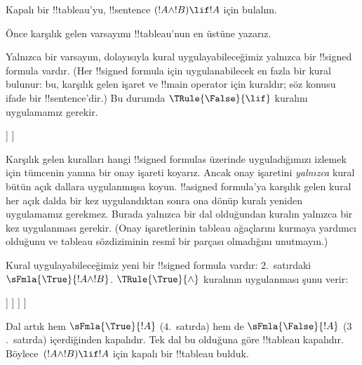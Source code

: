 

      {}
      {}


\begin{ex}
Kapalı bir !!{tableau}'yu, !!{sentence} $(!A \land !B) \lif !A$ için bulalım.

Önce karşılık gelen varsayımı !!{tableau}'nun en üstüne yazarız.
\begin{oltableau}
  [\sFmla{\False}{(\formula{A} \land \formula{B}) \lif \formula{A}},
    just = \TAss]
\end{oltableau}

Yalnızca bir varsayım, dolayısıyla kural uygulayabileceğimiz yalnızca bir
!!{signed formula} vardır. (Her !!{signed formula} için uygulanabilecek en
fazla bir kural bulunur: bu, karşılık gelen işaret ve !!{main operator} için
kuraldır; söz konusu ifade bir !!{sentence}'dir.) Bu durumda
$\TRule{\False}{\lif}$ kuralını uygulamamız gerekir.
\begin{oltableau}
  [\sFmla{\False}{(\formula{A} \land \formula{B}) \lif \formula{A}},
    checked, just = \TAss
    [\sFmla{\True}{\formula{A} \land \formula{B}},
      just={\TRule{\False}{\lif}[1]}
      [\sFmla{\False}{\formula{A}}, just={\TRule{\False}{\lif}[1]}]
    ]
  ]
\end{oltableau}
Karşılık gelen kuralları hangi !!{signed formula}s üzerinde uyguladığımızı
izlemek için tümcenin yanına bir onay işareti koyarız. Ancak onay işaretini
\emph{yalnızca} kural bütün açık dallara uygulanmışsa koyun.
!!a{signed formula}'ya karşılık gelen kural her açık dalda bir kez uygulandıktan sonra
ona dönüp kuralı yeniden uygulamamız gerekmez. Burada yalnızca bir dal
olduğundan kuralın yalnızca bir kez uygulanması gerekir. (Onay işaretlerinin
tableau ağaçlarını kurmaya yardımcı olduğunu ve tableau sözdiziminin resmî
bir parçası olmadığını unutmayın.)

Kural uygulayabileceğimiz yeni bir !!{signed formula} vardır: $2$.~satırdaki
$\sFmla{\True}{!A \land !B}$. $\TRule{\True}{\land}$ kuralının uygulanması
şunu verir:
\begin{oltableau}
  [\sFmla{\False}{(\formula{A} \land \formula{B}) \lif \formula{A}},
    checked, just = \TAss
    [\sFmla{\True}{\formula{A} \land \formula{B}},
      just={\TRule{\False}{\lif}[1]}, checked
      [\sFmla{\False}{\formula{A}}, just={\TRule{\False}{\lif}[1]}
        [\sFmla{\True}{\formula{A}}, just={\TRule{\True}{\land}[2]}
          [\sFmla{\True}{\formula{B}}, just={\TRule{\True}{\land}[2]}, close
          ]
        ]
      ]
    ]
  ]
\end{oltableau}
Dal artık hem $\sFmla{\True}{!A}$ ($4$.~satırda) hem de
$\sFmla{\False}{!A}$ ($3$.~satırda) içerdiğinden kapalıdır. Tek dal bu
olduğuna göre !!{tableau} kapalıdır. Böylece~$(!A \land !B) \lif !A$ için
kapalı bir !!{tableau} bulduk.
\end{ex}

